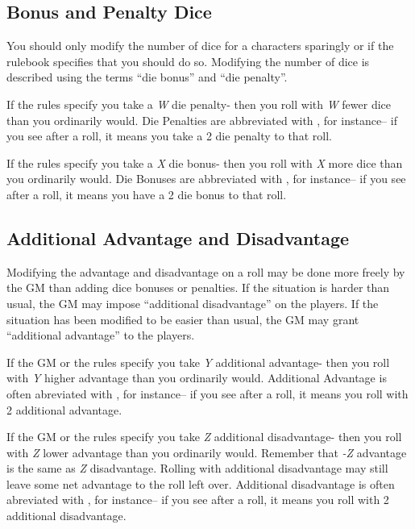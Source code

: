 \subsection{Bonus and Penalty Dice}
You should only modify the number of dice for a characters sparingly or if the rulebook specifies that you should do so. Modifying the number of dice is described using the terms ``die bonus'' and ``die penalty''.

If the rules specify you take a \emph{W} die penalty- then you roll with \emph{W} fewer dice than you ordinarily would. Die Penalties are abbreviated with , for instance-- if you see  after a roll, it means you take a 2 die penalty to that roll.

If the rules specify you take a \emph{X} die bonus- then you roll with \emph{X} more dice than you ordinarily would. Die Bonuses are abbreviated with , for instance-- if you see  after a roll, it means you have a 2 die bonus to that roll.

\subsection{Additional Advantage and Disadvantage}
Modifying the advantage and disadvantage on a roll may be done more freely by the GM than adding dice bonuses or penalties. If the situation is harder than usual, the GM may impose ``additional disadvantage'' on the players. If the situation has been modified to be easier than usual, the GM may grant ``additional advantage'' to the players.

If the GM or the rules specify you take \emph{Y} additional advantage- then you roll with \emph{Y} higher advantage than you ordinarily would. Additional Advantage is often abreviated with , for instance-- if you see  after a roll, it means you roll with 2 additional advantage.

If the GM or the rules specify you take \emph{Z} additional disadvantage- then you roll with \emph{Z} lower advantage than you ordinarily would. Remember that \emph{-Z} advantage is the same as \emph{Z} disadvantage. Rolling with additional disadvantage may still leave some net advantage to the roll left over. Additional disadvantage is often abreviated with , for instance-- if you see  after a roll, it means you roll with 2 additional disadvantage.

